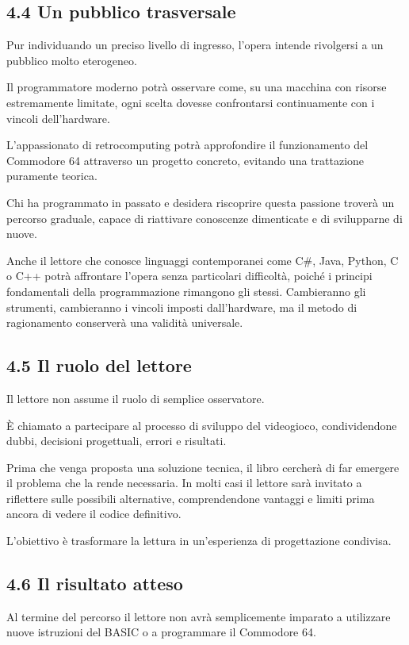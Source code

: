 \documentclass{article}
\begin{document}
\subsection{4.4 Un pubblico trasversale}
Pur individuando un preciso livello di ingresso, l'opera intende rivolgersi a un pubblico molto eterogeneo.

Il programmatore moderno potrà osservare come, su una macchina con risorse estremamente limitate, ogni scelta dovesse
confrontarsi continuamente con i vincoli dell'hardware.

L'appassionato di retrocomputing potrà approfondire il funzionamento del Commodore 64 attraverso un progetto concreto,
evitando una trattazione puramente teorica.

Chi ha programmato in passato e desidera riscoprire questa passione troverà un percorso graduale, capace di riattivare
conoscenze dimenticate e di svilupparne di nuove.

Anche il lettore che conosce linguaggi contemporanei come C\#, Java, Python, C o C++ potrà affrontare l'opera senza
particolari difficoltà, poiché i principi fondamentali della programmazione rimangono gli stessi. Cambieranno gli
strumenti, cambieranno i vincoli imposti dall'hardware, ma il metodo di ragionamento conserverà una validità
universale.

\subsection{4.5 Il ruolo del lettore}
Il lettore non assume il ruolo di semplice osservatore.

È chiamato a partecipare al processo di sviluppo del videogioco, condividendone dubbi, decisioni progettuali, errori e
risultati.

Prima che venga proposta una soluzione tecnica, il libro cercherà di far emergere il problema che la rende necessaria.
In molti casi il lettore sarà invitato a riflettere sulle possibili alternative, comprendendone vantaggi e limiti prima
ancora di vedere il codice definitivo.

L'obiettivo è trasformare la lettura in un'esperienza di progettazione condivisa.

\subsection{4.6 Il risultato atteso}
Al termine del percorso il lettore non avrà semplicemente imparato a utilizzare nuove istruzioni del BASIC o a
programmare il Commodore 64.
\end{document}

